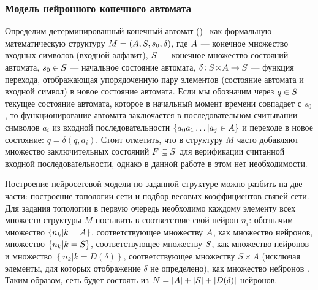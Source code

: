 \subsubsection{Модель нейронного конечного автомата}

Определим детерминированный конечный автомат ()~\cite{Hopcroft2008} как формальную математическую структуру $M = \left( A, S, s_{0}, \delta \right)$, где $A$ --- конечное множество входных символов (входной алфавит), $S$ --- конечное множество состояний автомата, $s_{0} \in S$ --- начальное состояние автомата, $\delta\!: S\!\times\!A \to S$ --- функция перехода, отображающая упорядоченную пару элементов (состояние автомата и входной символ) в новое состояние автомата. Если мы обозначим через $q \in S$ текущее состояние автомата, которое в начальный момент времени совпадает с $s_{0}$, то функционирование автомата заключается в последовательном считывании символов $a_{i}$ из входной последовательности $\left\{ a_{0} a_{1} \ldots | a_{j} \in A \right\}$ и переходе в новое состояние: $q = \delta \left( q, a_{i} \right)$. Стоит отметить, что в структуру $M$ часто добавляют множество \socalled заключительных состояний $F \subseteq S$ для верификации считанной входной последовательности, однако в данной работе в этом нет необходимости.

Построение нейросетевой модели по заданной структуре  можно разбить на две части: построение топологии сети и подбор весовых коэффициентов связей сети. Для задания топологии в первую очередь необходимо каждому элементу всех множеств структуры $M$ поставить в соответствие свой нейрон $n_{i}$: обозначим множество $\left\{ n_{k} | k = A \right\}$, соответствующее множеству $A$, как множество  нейронов, множество $\left\{ n_{k} | k = S \right\}$, соответствующее множеству $S$, как множество нейронов  и множество $\left\{ n_{k} | k = D(\delta) \right\}$, соответствующее множеству $S\!\times\!A$ (исключая элементы, для которых отображение $\delta$ не определено), как множество нейронов . Таким образом, сеть будет состоять из $N = \left|A\right| + \left|S\right| + \left|D(\delta)\right|$ нейронов.

